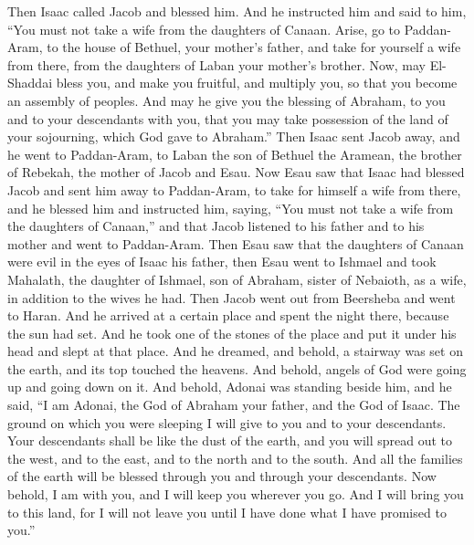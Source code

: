 \begin{biblechapter} %
 Then Isaac called Jacob and blessed him. And he instructed him and said to him, “You must not take a wife from the daughters of Canaan.
\verse Arise, go to Paddan-Aram, to the house of Bethuel, your mother’s father, and take for yourself a wife from there, from the daughters of Laban your mother’s brother.
\verse Now, may El-Shaddai bless you, and make you fruitful, and multiply you, so that you become an assembly of peoples.
\verse And may he give you the blessing of Abraham, to you and to your descendants with you, that you may take possession of the land of your sojourning, which God gave to Abraham.”
\verse Then Isaac sent Jacob away, and he went to Paddan-Aram, to Laban the son of Bethuel the Aramean, the brother of Rebekah, the mother of Jacob and Esau.
\verse Now Esau saw that Isaac had blessed Jacob and sent him away to Paddan-Aram, to take for himself a wife from there, and he blessed him and instructed him, saying, “You must not take a wife from the daughters of Canaan,”
\verse and that Jacob listened to his father and to his mother and went to Paddan-Aram.
\verse Then Esau saw that the daughters of Canaan were evil in the eyes of Isaac his father,
\verse then Esau went to Ishmael and took Mahalath, the daughter of Ishmael, son of Abraham, sister of Nebaioth, as a wife, in addition to the wives he had.
 Then Jacob went out from Beersheba and went to Haran.
\verse And he arrived at a certain place and spent the night there, because the sun had set. And he took one of the stones of the place and put it under his head and slept at that place.
\verse And he dreamed, and behold, a stairway was set on the earth, and its top touched the heavens. And behold, angels of God were going up and going down on it.
\verse And behold, Adonai was standing beside him, and he said, “I am Adonai, the God of Abraham your father, and the God of Isaac. The ground on which you were sleeping I will give to you and to your descendants.
\verse Your descendants shall be like the dust of the earth, and you will spread out to the west, and to the east, and to the north and to the south. And all the families of the earth will be blessed through you and through your descendants.
\verse Now behold, I am with you, and I will keep you wherever you go. And I will bring you to this land, for I will not leave you until I have done what I have promised to you.”

\end{biblechapter}

